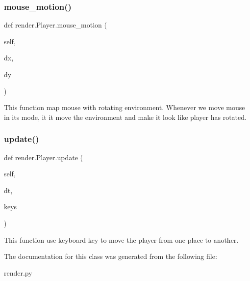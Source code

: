 \subsubsection{\texorpdfstring{mouse\+\_\+motion()}{mouse\_motion()}}
{\footnotesize\ttfamily def render.\+Player.\+mouse\+\_\+motion (\begin{DoxyParamCaption}\item[{}]{self,  }\item[{}]{dx,  }\item[{}]{dy }\end{DoxyParamCaption})}

\begin{DoxyVerb}This function map mouse with rotating environment. Whenever we move mouse in its mode, it it move the environment and make it look like player has rotated.\end{DoxyVerb}
 \mbox{\label{classrender_1_1Player_abfc260eae15590061b8a0a463d0055c6}} 
\subsubsection{\texorpdfstring{update()}{update()}}
{\footnotesize\ttfamily def render.\+Player.\+update (\begin{DoxyParamCaption}\item[{}]{self,  }\item[{}]{dt,  }\item[{}]{keys }\end{DoxyParamCaption})}

\begin{DoxyVerb}This function use keyboard key to move the player from one place to another.\end{DoxyVerb}
 

The documentation for this class was generated from the following file\+:\begin{DoxyCompactItemize}
\item 
render.\+py\end{DoxyCompactItemize}
